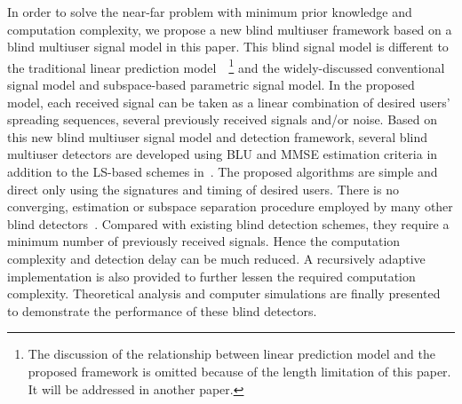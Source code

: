 \documentclass[a4paper,10pt,fleqn, twocolumn]{IEEETran}
\begin{document}
In order to solve the near-far problem with minimum prior
knowledge and computation complexity, we propose a new blind
multiuser framework based on a blind multiuser signal model in
this paper. This blind signal model is different to the
traditional linear prediction model~\cite{Haykin96}~\footnote{The
discussion of the relationship between linear prediction model and
the proposed framework is omitted because of the length limitation
of this paper. It will be addressed in another paper.} and the
widely-discussed conventional signal model and subspace-based
parametric signal model. In the proposed model, each received
signal can be taken as a linear combination of desired users'
spreading sequences, several previously received signals and/or
noise. Based on this new blind multiuser signal model and
detection framework, several blind multiuser detectors are
developed using BLU and MMSE estimation criteria in addition to
the LS-based schemes in~\cite{Wang03d,Wang03e}. The proposed
algorithms are simple and direct only using the signatures and
timing of desired users. There is no converging, estimation or
subspace separation procedure employed by many other blind
detectors~\cite{Madh94,Honi95,Wang98,Wang99}. Compared with
existing blind detection schemes, they require a minimum number of
previously received signals. Hence the computation complexity and
detection delay can be much reduced. A recursively adaptive
implementation is also provided to further lessen the required
computation complexity. Theoretical analysis and computer
simulations are finally presented to demonstrate the performance
of these blind detectors.
\end{document}
